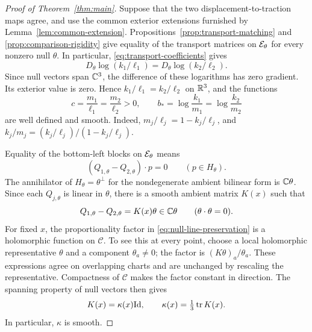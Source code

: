 \begin{proof}[Proof of Theorem~\ref{thm:main}]
Suppose that the two displacement-to-traction maps agree, and use the
common exterior extensions furnished by Lemma~\ref{lem:common-extension}.
Propositions~\ref{prop:transport-matching} and
\ref{prop:comparison-rigidity} give equality of the transport matrices
on $\mathcal E_\theta$ for every nonzero null $\theta$.  In particular,
\eqref{eq:transport-coefficients} gives
\[
 D_\theta\log(k_1/\ell_1)
   =D_\theta\log(k_2/\ell_2).
\]
Since null vectors span $\mathbb C^3$, the difference of these logarithms has
zero gradient.  Its exterior value is zero.  Hence $k_1/\ell_1=k_2/\ell_2$
on $\mathbb R^3$, and the functions
\begin{equation}\label{eq:common-ratios}
 c=\frac{m_1}{\ell_1}=\frac{m_2}{\ell_2}>0,
 \qquad b_* =\log\frac{k_1}{m_1}=\log\frac{k_2}{m_2}
\end{equation}
are well defined and smooth.  Indeed, $m_j/\ell_j=1-k_j/\ell_j$, and
$k_j/m_j=(k_j/\ell_j)/(1-k_j/\ell_j)$.

Equality of the bottom-left blocks on $\mathcal E_\theta$ means
\[
 (Q_{1,\theta}-Q_{2,\theta})\cdot p=0
 \qquad(p\in H_\theta).
\]
The annihilator of $H_\theta=\theta^\perp$ for the nondegenerate
ambient bilinear form is $\mathbb C\theta$.  Since each $Q_{j,\theta}$ is
linear in $\theta$, there is a smooth ambient matrix $K(x)$ such that
\begin{equation}\label{eq:null-line-preservation}
 Q_{1,\theta}-Q_{2,\theta}=K(x)\theta\in\mathbb C\theta
 \qquad(\theta\cdot\theta=0).
\end{equation}
For fixed $x$, the proportionality factor in
\eqref{eq:null-line-preservation} is a holomorphic function on $\mathcal C$.
To see this at every point, choose a local holomorphic representative
$\theta$ and a component $\theta_a\ne0$; the factor is
$(K\theta)_a/\theta_a$.  These expressions agree on overlapping charts
and are unchanged by rescaling the representative.  Compactness of
$\mathcal C$ makes the factor constant in direction.  The spanning
property of null vectors then gives
\begin{equation}\label{eq:scalar-ambient-difference}
 K(x)=\kappa(x)\mathrm{Id},\qquad \kappa(x)=\tfrac13\operatorname{tr} K(x).
\end{equation}
In particular, $\kappa$ is smooth.


\end{proof}
